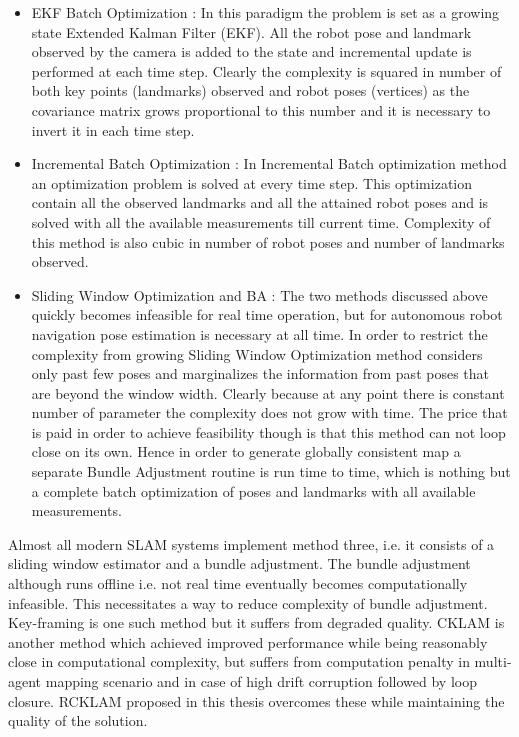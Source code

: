 \begin{itemize}
  \item EKF Batch Optimization : 
  In this paradigm the problem is set as a growing state Extended Kalman Filter (EKF). All the robot pose and landmark observed by the camera is added to the state and incremental update is performed at each time step. Clearly the complexity is squared in number of both key points (landmarks) observed and robot poses (vertices) as the covariance matrix grows proportional to this number and it is necessary to invert it in each time step. 
  \item Incremental Batch Optimization : 
  In Incremental Batch optimization method an optimization problem is solved at every time step. This optimization contain all the observed landmarks and all the attained robot poses and is solved with all the available measurements till current time. Complexity of this method is also cubic in number of robot poses and number of landmarks observed.
  \item Sliding Window Optimization and BA : 
  The two methods discussed above quickly becomes infeasible for real time operation, but for autonomous robot navigation pose estimation is necessary at all time. In order to restrict the complexity from growing Sliding Window Optimization method considers only past few poses and marginalizes the information from past poses that are beyond the window width. Clearly because at any point there is constant number of parameter the complexity does not grow with time. The price that is paid in order to achieve feasibility though is that this method can not loop close on its own. Hence in order to generate globally consistent map a separate Bundle Adjustment routine is run time to time, which is nothing but a complete batch optimization of poses and landmarks with all available measurements.
\end{itemize}

Almost all modern SLAM systems implement method three, i.e. it consists of a sliding window estimator and a bundle adjustment. The bundle adjustment although runs offline i.e. not real time eventually becomes computationally infeasible. This necessitates a way to reduce complexity of bundle adjustment. Key-framing is one such method but it suffers from degraded quality. CKLAM is another method which achieved improved performance while being reasonably close in computational complexity, but suffers from computation penalty in multi-agent mapping scenario and in case of high drift corruption followed by loop closure. RCKLAM proposed in this thesis overcomes these while maintaining the quality of the solution.

